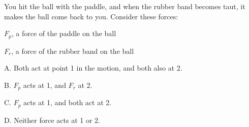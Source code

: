 \begin{qu}
\num{} You hit the ball with the paddle,
and when the rubber band becomes taut, it makes the ball come back to you.
Consider these forces:

$F_p$, a force of the paddle on the ball

$F_r$, a force of the rubber band on the ball

\noindent A. Both act at point 1 in the motion, and both also at 2.

\noindent B. $F_p$ acts at 1, and $F_r$ at 2.

\noindent C. $F_p$ acts at 1, and both act at 2.

\noindent D. Neither force acts at 1 or 2.

\end{qu}
